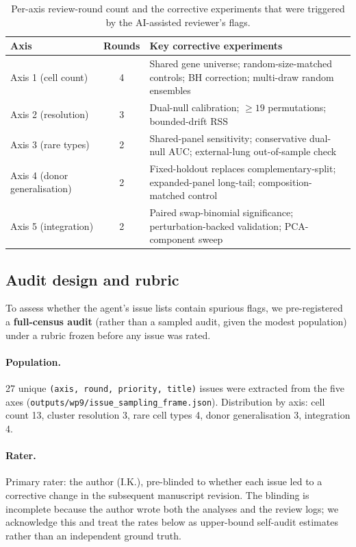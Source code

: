 \documentclass[a4paper,11pt]{article}
\begin{document}
\begin{table}[ht]
\centering
\caption{Per-axis review-round count and the corrective experiments
that were triggered by the AI-assisted reviewer's flags.}
\label{tab:s2}
\small
\begin{tabularx}{\textwidth}{l c X}
\toprule
\textbf{Axis} & \textbf{Rounds} & \textbf{Key corrective experiments} \\
\midrule
Axis 1 (cell count)         & 4 & Shared gene universe; random-size-matched controls; BH correction; multi-draw random ensembles \\
Axis 2 (resolution)         & 3 & Dual-null calibration; $\geq 19$ permutations; bounded-drift RSS \\
Axis 3 (rare types)         & 2 & Shared-panel sensitivity; conservative dual-null AUC; external-lung out-of-sample check \\
Axis 4 (donor generalisation) & 2 & Fixed-holdout replaces complementary-split; expanded-panel long-tail; composition-matched control \\
Axis 5 (integration)        & 2 & Paired swap-binomial significance; perturbation-backed validation; PCA-component sweep \\
\bottomrule
\end{tabularx}
\end{table}

\subsection{Audit design and rubric}

To assess whether the agent's issue lists contain spurious flags, we
pre-registered a \textbf{full-census audit} (rather than a sampled audit,
given the modest population) under a rubric frozen before any issue
was rated.

\paragraph{Population.}
27 unique \texttt{(axis, round, priority, title)} issues were extracted
from the five axes
(\texttt{outputs/wp9/issue\_sampling\_frame.json}). Distribution by
axis: cell count 13, cluster resolution 3, rare cell types 4, donor
generalisation 3, integration 4.

\paragraph{Rater.}
Primary rater: the author (I.K.), pre-blinded to whether each issue
led to a corrective change in the subsequent manuscript revision. The
blinding is incomplete because the author wrote both the analyses and
the review logs; we acknowledge this and treat the rates below as
upper-bound self-audit estimates rather than an independent ground
truth.
\end{document}
